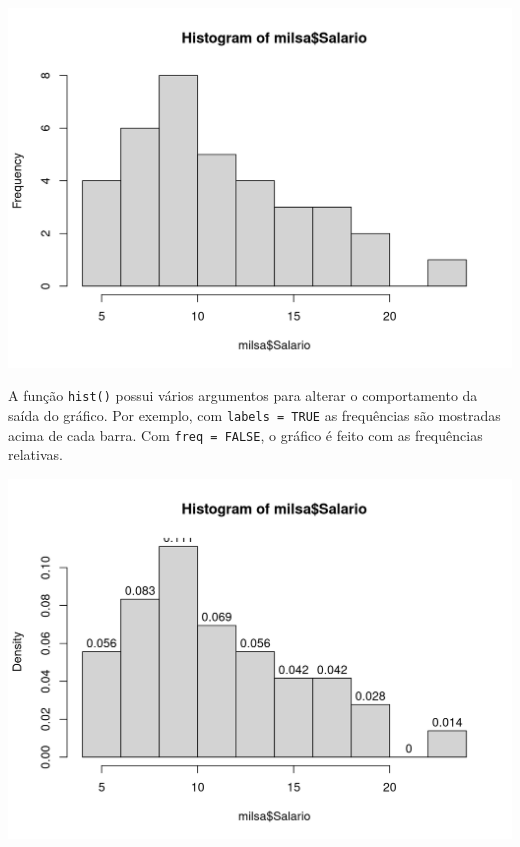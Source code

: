 \documentclass[
  10pt,
  a4paper]{book}
\newenvironment{Shaded}{\begin{snugshade}}{\end{snugshade}}
\newcommand{\AttributeTok}[1]{\textcolor[rgb]{0.77,0.63,0.00}{#1}}
\newcommand{\ConstantTok}[1]{\textcolor[rgb]{0.00,0.00,0.00}{#1}}
\newcommand{\FunctionTok}[1]{\textcolor[rgb]{0.00,0.00,0.00}{#1}}
\newcommand{\NormalTok}[1]{#1}
\newcommand{\SpecialCharTok}[1]{\textcolor[rgb]{0.00,0.00,0.00}{#1}}
\begin{document}
\begin{center}\includegraphics{figures/unnamed-chunk-308-1} \end{center}

A função \texttt{hist()} possui vários argumentos para alterar o comportamento
da saída do gráfico. Por exemplo, com \texttt{labels\ =\ TRUE} as frequências são
mostradas acima de cada barra. Com \texttt{freq\ =\ FALSE}, o gráfico é feito com
as frequências relativas.

\begin{Shaded}
\end{Shaded}

\begin{center}\includegraphics{figures/unnamed-chunk-309-1} \end{center}
\end{document}
